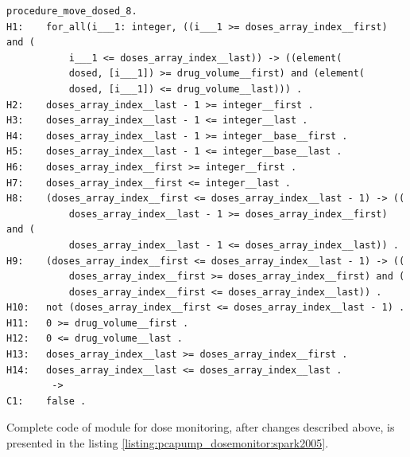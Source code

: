 \singlespacing
\begin{lstlisting}[frame=single, gobble=0, caption={Dead path in \lstinline{Move_Dosed} procedure}, label={listing:pcapump_dosemonitor:dead_path}]
procedure_move_dosed_8.
H1:    for_all(i___1: integer, ((i___1 >= doses_array_index__first) and (
           i___1 <= doses_array_index__last)) -> ((element(
           dosed, [i___1]) >= drug_volume__first) and (element(
           dosed, [i___1]) <= drug_volume__last))) .
H2:    doses_array_index__last - 1 >= integer__first .
H3:    doses_array_index__last - 1 <= integer__last .
H4:    doses_array_index__last - 1 >= integer__base__first .
H5:    doses_array_index__last - 1 <= integer__base__last .
H6:    doses_array_index__first >= integer__first .
H7:    doses_array_index__first <= integer__last .
H8:    (doses_array_index__first <= doses_array_index__last - 1) -> ((
           doses_array_index__last - 1 >= doses_array_index__first) and (
           doses_array_index__last - 1 <= doses_array_index__last)) .
H9:    (doses_array_index__first <= doses_array_index__last - 1) -> ((
           doses_array_index__first >= doses_array_index__first) and (
           doses_array_index__first <= doses_array_index__last)) .
H10:   not (doses_array_index__first <= doses_array_index__last - 1) .
H11:   0 >= drug_volume__first .
H12:   0 <= drug_volume__last .
H13:   doses_array_index__last >= doses_array_index__first .
H14:   doses_array_index__last <= doses_array_index__last .
        ->
C1:    false .
\end{lstlisting}
\doublespacing

Complete code of module for dose monitoring, after changes described above, is presented in the listing \ref{listing:pcapump_dosemonitor:spark2005}.

